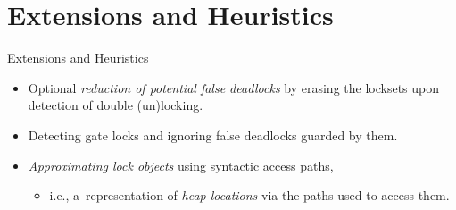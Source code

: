 \documentclass[10pt, xcolor=pdflatex, hyperref={unicode}, aspectratio=169]{beamer}
\begin{document}


\section{Extensions and Heuristics}
\begin{frame}{Extensions and Heuristics}
    \begin{itemize}\setlength\itemsep{3em}
        \item Optional \emph{reduction of potential false deadlocks} by erasing the locksets upon \alert{detection of double (un)locking}.

        \item Detecting \alert{gate locks} and ignoring false deadlocks guarded by them.

        \item \emph{Approximating lock objects} using \alert{syntactic access paths},
            \medskip
            \begin{itemize}\setlength\itemsep{.5em}
                \item i.e., a~representation of \emph{heap locations} via the paths used to access them.
            \end{itemize}
    \end{itemize}
\end{frame}


\end{document}
